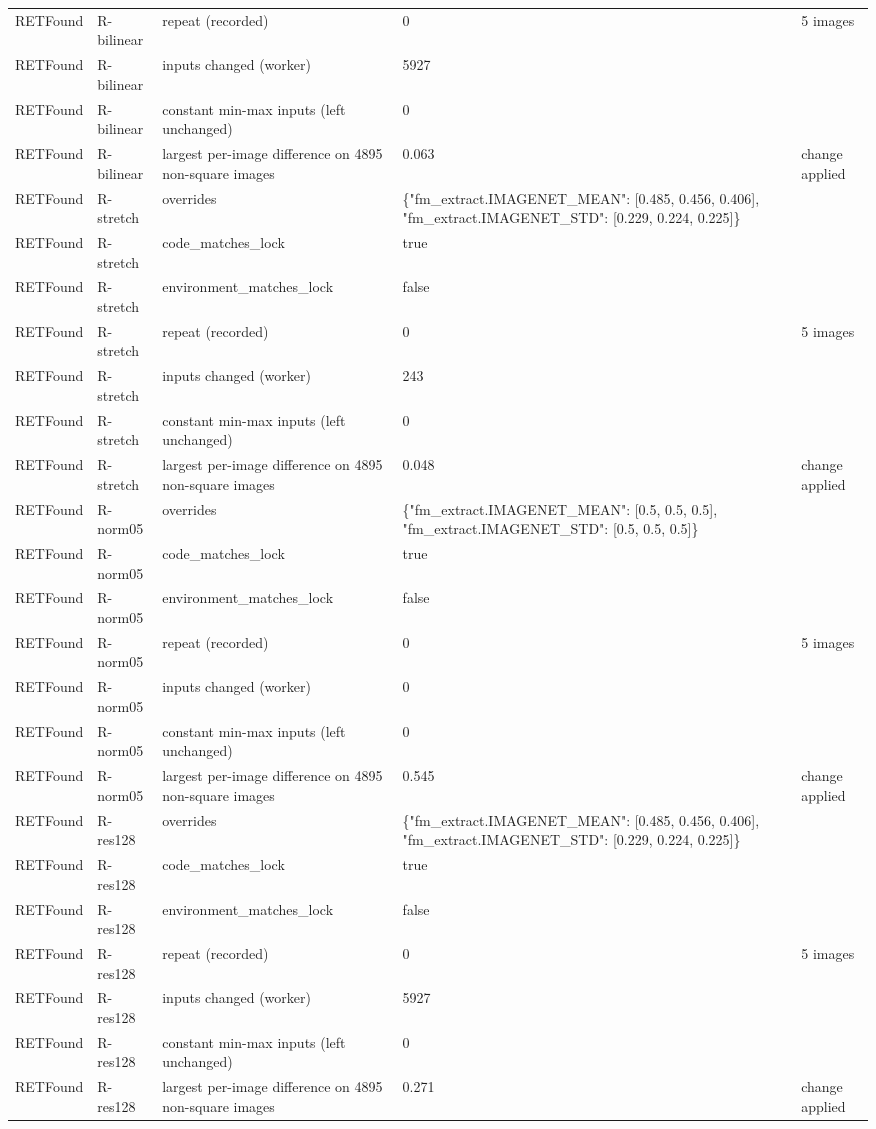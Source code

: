 \begin{longtable}{@{}llp{5.8cm}p{3.7cm}p{3.5cm}@{}}
RETFound & R-bilinear & repeat (recorded) & 0 & 5 images \\
RETFound & R-bilinear & inputs changed (worker) & 5927 &  \\
RETFound & R-bilinear & constant min-max inputs (left unchanged) & 0 &  \\
RETFound & R-bilinear & largest per-image difference on 4895 non-square images & 0.063 & change applied \\
RETFound & R-stretch & overrides & \{"fm\_extract.IMAGENET\_MEAN": [0.485, 0.456, 0.406], "fm\_extract.IMAGENET\_STD": [0.229, 0.224, 0.225]\} &  \\
RETFound & R-stretch & code\_matches\_lock & true &  \\
RETFound & R-stretch & environment\_matches\_lock & false &  \\
RETFound & R-stretch & repeat (recorded) & 0 & 5 images \\
RETFound & R-stretch & inputs changed (worker) & 243 &  \\
RETFound & R-stretch & constant min-max inputs (left unchanged) & 0 &  \\
RETFound & R-stretch & largest per-image difference on 4895 non-square images & 0.048 & change applied \\
RETFound & R-norm05 & overrides & \{"fm\_extract.IMAGENET\_MEAN": [0.5, 0.5, 0.5], "fm\_extract.IMAGENET\_STD": [0.5, 0.5, 0.5]\} &  \\
RETFound & R-norm05 & code\_matches\_lock & true &  \\
RETFound & R-norm05 & environment\_matches\_lock & false &  \\
RETFound & R-norm05 & repeat (recorded) & 0 & 5 images \\
RETFound & R-norm05 & inputs changed (worker) & 0 &  \\
RETFound & R-norm05 & constant min-max inputs (left unchanged) & 0 &  \\
RETFound & R-norm05 & largest per-image difference on 4895 non-square images & 0.545 & change applied \\
RETFound & R-res128 & overrides & \{"fm\_extract.IMAGENET\_MEAN": [0.485, 0.456, 0.406], "fm\_extract.IMAGENET\_STD": [0.229, 0.224, 0.225]\} &  \\
RETFound & R-res128 & code\_matches\_lock & true &  \\
RETFound & R-res128 & environment\_matches\_lock & false &  \\
RETFound & R-res128 & repeat (recorded) & 0 & 5 images \\
RETFound & R-res128 & inputs changed (worker) & 5927 &  \\
RETFound & R-res128 & constant min-max inputs (left unchanged) & 0 &  \\
RETFound & R-res128 & largest per-image difference on 4895 non-square images & 0.271 & change applied \\
\end{longtable}
